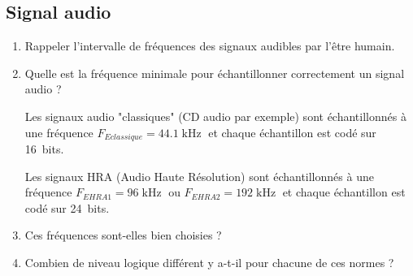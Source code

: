 \enteteThematiqueObligatoire{}
\enteteCorrection{}


\subsection*{Signal audio}

\begin{enumerate}
	\item Rappeler l'intervalle de fréquences des signaux audibles par l'être humain.
	

	\item Quelle est la fréquence minimale pour échantillonner correctement un signal audio ?
	

Les signaux audio "classiques" (CD audio par exemple) sont échantillonnés à une fréquence $F_{Eclassique} = 44.1\operatorname{kHz}$ et chaque échantillon est codé sur 16~bits. 

Les signaux HRA (Audio Haute Résolution) sont échantillonnés à une fréquence $F_{EHRA1} = 96\operatorname{kHz}$ ou $F_{EHRA2} = 192\operatorname{kHz}$ et chaque échantillon est codé sur 24~bits.

	\item Ces fréquences sont-elles bien choisies ?


	\item Combien de niveau logique différent y a-t-il pour chacune de ces normes ?

\end{enumerate}
